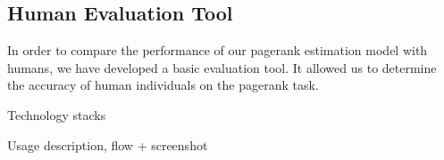 \subsection{Human Evaluation Tool}

In order to compare the performance of our pagerank estimation model with humans, we have developed a basic evaluation tool. It allowed us to determine the accuracy of human individuals on the pagerank task.

Technology stacks

Usage description, flow + screenshot
